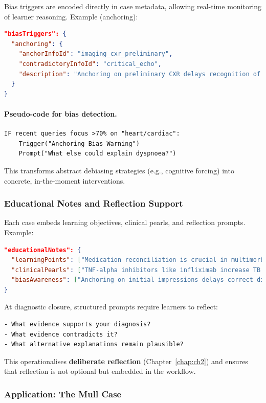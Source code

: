 Bias triggers are encoded directly in case metadata, allowing real-time monitoring of
learner reasoning. Example (anchoring):

\begin{lstlisting}[language=json]
"biasTriggers": {
  "anchoring": {
    "anchorInfoId": "imaging_cxr_preliminary",
    "contradictoryInfoId": "critical_echo",
    "description": "Anchoring on preliminary CXR delays recognition of normal echo."
  }
}
\end{lstlisting}

\paragraph{Pseudo-code for bias detection.}
\begin{verbatim}
IF recent queries focus >70% on "heart/cardiac":
    Trigger("Anchoring Bias Warning")
    Prompt("What else could explain dyspnoea?")
\end{verbatim}

This transforms abstract debiasing strategies (e.g., cognitive forcing) into concrete,
in-the-moment interventions.

\subsubsection{Educational Notes and Reflection Support}

Each case embeds learning objectives, clinical pearls, and reflection prompts. Example:

\begin{lstlisting}[language=json]
"educationalNotes": {
  "learningPoints": ["Medication reconciliation is crucial in multimorbidity"],
  "clinicalPearls": ["TNF-alpha inhibitors like infliximab increase TB risk"],
  "biasAwareness": ["Anchoring on initial impressions delays correct diagnosis"]
}
\end{lstlisting}

At diagnostic closure, structured prompts require learners to reflect:
\begin{verbatim}
- What evidence supports your diagnosis?
- What evidence contradicts it?
- What alternative explanations remain plausible?
\end{verbatim}

This operationalises \textbf{deliberate reflection} (Chapter~\ref{chap:ch2}) and ensures
that reflection is not optional but embedded in the workflow.

\subsubsection{Application: The Mull Case}

